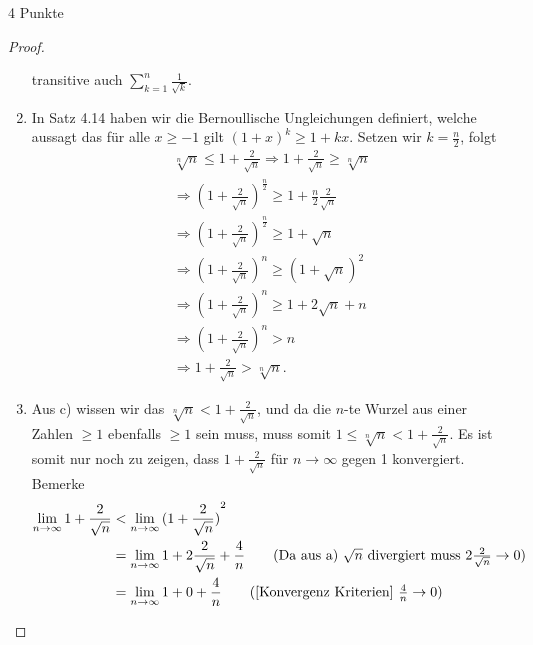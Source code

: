 \documentclass{problemset}
\begin{document}
\begin{problem}{4 Punkte}
\begin{proof}
\begin{enumerate}
              transitive auch $\sum_{k=1}^{n} \frac{1}{\sqrt{k}}$. \checkmark
        \item In Satz 4.14 haben wir die Bernoullische Ungleichungen definiert,
              welche aussagt das für alle $x \ge -1$ gilt ${(1+x)}^k \ge 1 +
              kx$. Setzen wir $k = \frac{n}{2}$, folgt
              \begin{align*}
                  \sqrt[n]{n} \leq 1 + \frac{2}{\sqrt{n}} \Longrightarrow 1 + \frac{2}{\sqrt{n}} \ge \sqrt[n]{n} \\
                  \Longrightarrow {(1 + \frac{2}{\sqrt{n}})}^{\frac{n}{2}} \ge 1 + \frac{n}{2}\frac{2}{\sqrt{n}} \\
                  \Longrightarrow {(1 + \frac{2}{\sqrt{n}})}^{\frac{n}{2}} \ge 1 + \sqrt{n}                      \\
                  \Longrightarrow {(1 + \frac{2}{\sqrt{n}})}^n \ge {(1 + \sqrt{n})}^{2}                          \\
                  \Longrightarrow {(1 + \frac{2}{\sqrt{n}})}^n \ge 1 + 2\sqrt{n} + n                             \\
                  \Longrightarrow {(1 + \frac{2}{\sqrt{n}})}^n > n                                               \\
                  \Longrightarrow 1 + \frac{2}{\sqrt{n}} > \sqrt[n]{n}.
              \end{align*}
              \checkmark
        \item Aus c) wissen wir das $\sqrt[n]{n} < 1 + \frac{2}{\sqrt{n}}$, und
              da die $n$-te Wurzel aus einer Zahlen $\ge 1$ ebenfalls $\ge 1$
              sein muss, muss somit $1 \le \sqrt[n]{n} < 1 +
              \frac{2}{\sqrt{n}}$. Es ist somit nur noch zu zeigen, dass $1 +
              \frac{2}{\sqrt{n}}$ für $n \to \infty$ gegen 1 konvergiert.
              Bemerke
              \begin{align*}
                  \lim_{n \to \infty} 1 + \frac{2}{\sqrt{n}} & < \lim_{n \to \infty} {( 1 + \frac{2}{\sqrt{n}})}^2                                                                                 \\
                                                             & = \lim_{n \to \infty} 1 + 2\frac{2}{\sqrt{n}} + \frac{4}{n} \tag{Da aus a) $\sqrt{n}$ divergiert muss $ 2\frac{2}{\sqrt{n}} \to 0$} \\
                                                             & = \lim_{n \to \infty} 1 + 0 + \frac{4}{n} \tag{[Konvergenz Kriterien] $\frac{4}{n} \to 0$}                                          \\

\end{align*}
\end{enumerate}
\end{proof}
\end{problem}
\end{document}

